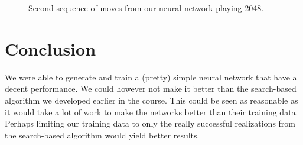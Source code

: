 \documentclass[11pt,a4paper]{article}
\begin{document}
\begin{figure}[h!]
\begin{subfigure}[b]{0.45\textwidth}
    \end{subfigure}
    \caption{Second sequence of moves from our neural network playing 2048.}
    \label{fig:second_seq}
\end{figure}

\section*{Conclusion}
We were able to generate and train a (pretty) simple neural network that have a decent performance. We could however not make it better than the search-based algorithm we developed earlier in the course. This could be seen as reasonable as it would take a lot of work to make the networks better than their training data. Perhaps limiting our training data to only the really successful realizations from the search-based algorithm would yield better results.
\end{document}
